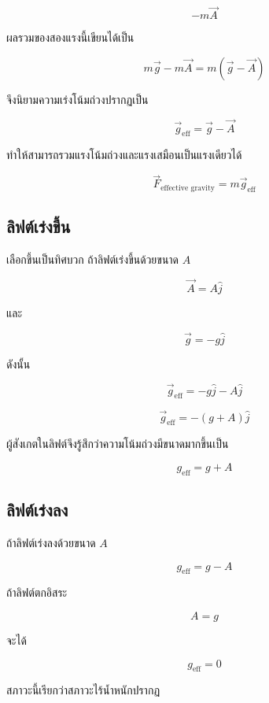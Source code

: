 \[
-m\vec A
\]

ผลรวมของสองแรงนี้เขียนได้เป็น

\[
m\vec g-m\vec A
=
m(\vec g-\vec A)
\]

จึงนิยามความเร่งโน้มถ่วงปรากฏเป็น

\[
\boxed{
\vec g_{\text{eff}}=\vec g-\vec A
}
\]

ทำให้สามารถรวมแรงโน้มถ่วงและแรงเสมือนเป็นแรงเดียวได้

\[
\boxed{
\vec F_{\text{effective gravity}}
=
m\vec g_{\text{eff}}
}
\]

\subsection{ลิฟต์เร่งขึ้น}

เลือกขึ้นเป็นทิศบวก ถ้าลิฟต์เร่งขึ้นด้วยขนาด $A$

\[
\vec A=A\hat{j}
\]

และ

\[
\vec g=-g\hat{j}
\]

ดังนั้น

\[
\vec g_{\text{eff}}
=
-g\hat{j}-A\hat{j}
\]

\[
\boxed{
\vec g_{\text{eff}}
=
-(g+A)\hat{j}
}
\]

ผู้สังเกตในลิฟต์จึงรู้สึกว่าความโน้มถ่วงมีขนาดมากขึ้นเป็น

\[
g_{\text{eff}}=g+A
\]

\subsection{ลิฟต์เร่งลง}

ถ้าลิฟต์เร่งลงด้วยขนาด $A$

\[
\boxed{
g_{\text{eff}}=g-A
}
\]

ถ้าลิฟต์ตกอิสระ

\[
A=g
\]

จะได้

\[
\boxed{
g_{\text{eff}}=0
}
\]

สภาวะนี้เรียกว่าสภาวะไร้น้ำหนักปรากฏ

